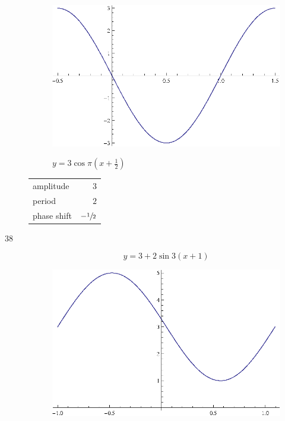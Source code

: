 \documentclass{exam}
\begin{document}
\begin{description}
        \begin{figure}[H]
          \centering
          \includegraphics[scale=1.0]{exercise37.eps}

          $y = 3 \cos \pi \left( x + \frac{1}{2} \right)$
        \end{figure}

        \begin{tabular}[H]{lr}
          \toprule
          amplitude   & $3$ \\
          period      & $2$ \\
          phase shift & $- \sfrac{1}{2}$ \\
          \bottomrule
        \end{tabular}

      \pagebreak

      \item[38]
        \[
          y = 3 + 2 \sin 3 \left( x + 1 \right) 
        \]

        \begin{figure}[H]
          \centering
          \includegraphics[scale=1.0]{exercise38.eps}


\end{figure}
\end{description}
\end{document}
